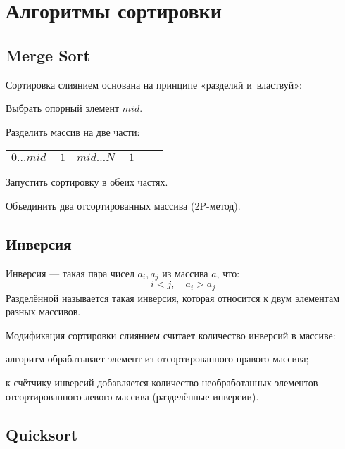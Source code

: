 \section{Алгоритмы сортировки}

\subsection{Merge Sort}

{\bold Сортировка слиянием} основана на принципе {\ital «разделяй и~властвуй»}:
\begin{list*}[][\#]
\item Выбрать опорный элемент $mid$.
\item Разделить массив на две части:

{\centering
\begin{tabular}{|Sc|Sc|}
\hline
$0\dots mid-1$ & $mid\dots N - 1$\\\hline
\end{tabular}\par}
\item Запустить сортировку в обеих частях.
\item Объединить два отсортированных массива {\ital\color{desc}(2P-метод)}.
\end{list*}

\subsection{Инверсия}

{\bold Инверсия} --- такая пара чисел $a_i,a_j$ из массива $a$, что:
$$i\less j,\quad a_i\greater a_j$$ 
{\bold Разделённой} называется такая {\ital инверсия}, которая относится к двум элементам {\ital разных} массивов.

{\bold Модификация} {\ital сортировки слиянием} считает количество инверсий в массиве:
\begin{list*}
\item алгоритм обрабатывает элемент из отсортированного правого массива;
\item к счётчику инверсий добавляется количество необработанных элементов отсортированного левого массива {\ital\color{desc}(разделённые инверсии)}. 
\end{list*}

\subsection{Quicksort}

